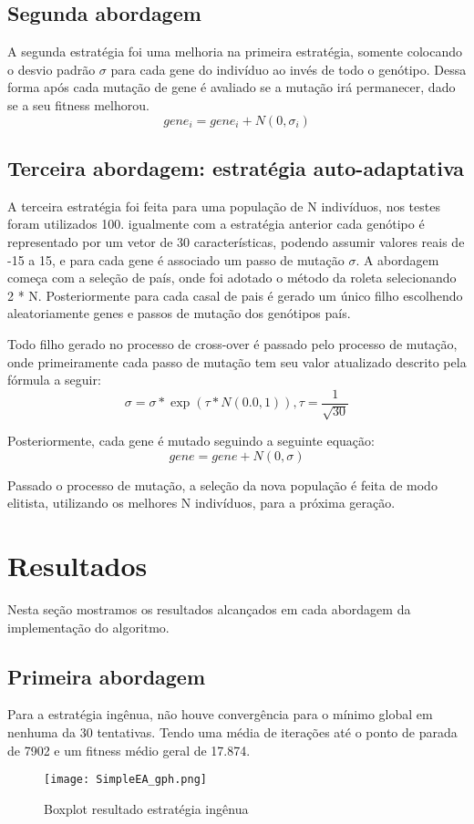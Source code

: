 \documentclass[
	article,			%
	11pt,				%
	oneside,			%
	a4paper,			%
	english,			%
	brazil,				%
	]{abntex2}
\begin{document}
\subsection{Segunda abordagem}
A segunda estratégia foi uma melhoria na primeira estratégia, somente colocando o desvio padrão $\sigma$ para cada gene do indivíduo ao invés de todo o genótipo. Dessa forma após cada mutação de gene é avaliado se a mutação irá permanecer, dado se a seu fitness melhorou.
\begin{equation}
    gene_i = gene_i + N(0,\sigma_i)
\end{equation}

\subsection{Terceira abordagem: estratégia auto-adaptativa}
A terceira estratégia foi feita para uma população de N indivíduos, nos testes foram utilizados 100. igualmente com a estratégia anterior cada genótipo é representado por um vetor de 30 características, podendo assumir valores reais de -15 a 15, e para cada gene é associado um passo de mutação $\sigma$. A abordagem começa com a seleção de país, onde foi adotado o método da roleta selecionando 2 * N. Posteriormente para cada casal de pais é gerado um único filho escolhendo aleatoriamente genes e passos de mutação dos genótipos país.
\par
Todo filho gerado no processo de cross-over é passado pelo processo de mutação, onde primeiramente cada passo de mutação tem seu valor atualizado descrito pela fórmula a seguir:
\begin{equation}
      \sigma = \sigma * \exp(\tau * N(0.0,1)), \tau = \frac{1}{\sqrt{30}} 
\end{equation}
\par
Posteriormente, cada gene é mutado seguindo a seguinte equação:
\begin{equation}
    gene = gene + N(0,\sigma)
\end{equation}
\par
Passado o processo de mutação, a seleção da nova população é feita de modo elitista, utilizando os melhores N indivíduos, para a próxima geração. 
\section{Resultados}
Nesta seção mostramos os resultados alcançados em cada abordagem da implementação do algoritmo.
\subsection{Primeira abordagem}
Para a estratégia ingênua, não houve convergência para o mínimo global em nenhuma da 30 tentativas. Tendo uma média de iterações até o ponto de parada de 7902 e um fitness médio geral de 17.874.
\begin{figure}[h]
    \centering
    \texttt{[image: SimpleEA\_gph.png]}
    \caption{Boxplot resultado estratégia ingênua}
\end{figure}
\end{document}

